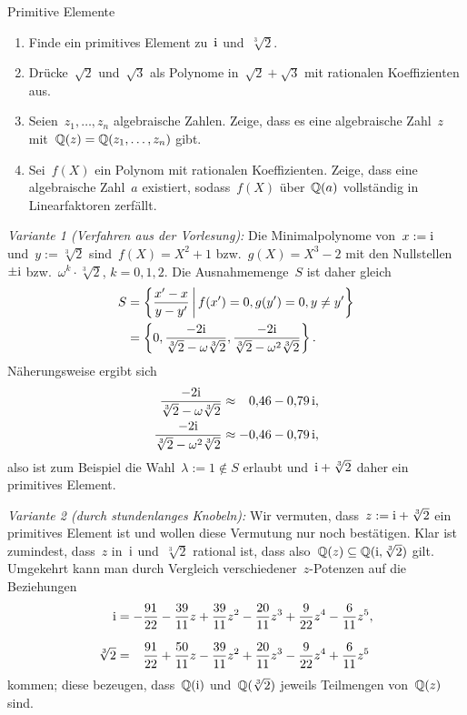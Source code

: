 \documentclass{algblatt}
\begin{document}
\begin{aufgabe}{Primitive Elemente}
\begin{enumerate}
\item Finde ein primitives Element zu~$\mathrm{i}$ und~$\sqrt[3]{2}$.
\item Drücke~$\sqrt{2}$ und~$\sqrt{3}$ als Polynome in~$\sqrt{2} + \sqrt{3}$
mit rationalen Koeffizienten aus.
\item Seien~$z_1,\ldots,z_n$ algebraische Zahlen. Zeige, dass es eine
algebraische Zahl~$z$ mit~$\mathbb{Q}(z) = \mathbb{Q}(z_1,\ldots,z_n)$ gibt.
\item Sei~$f(X)$ ein Polynom mit rationalen Koeffizienten. Zeige, dass eine
algebraische Zahl~$a$ existiert, sodass~$f(X)$ über~$\mathbb{Q}(a)$ vollständig in
Linearfaktoren zerfällt.\ifloesungen\enlargethispage{2em}\fi
\end{enumerate}

\begin{loesungE}
\item
\emph{Variante 1 (Verfahren aus der Vorlesung):}
Die Minimalpolynome von~$x := \mathrm{i}$ und~$y := \sqrt[3]{2}$ sind~$f(X) = X^2 + 1$
bzw.~$g(X) = X^3 - 2$ mit den Nullstellen~$\pm \mathrm{i}$ bzw.~$\omega^k \cdot \sqrt[3]{2}$,
$k=0,1,2$. Die Ausnahmemenge~$S$ ist daher gleich
\begin{align*}
  S &= \left\{ \frac{x' - x}{y - y'} \,\middle|\, f(x') = 0, g(y') = 0, y \neq
  y' \right\} \\
  &= \left\{ 0, \frac{-2\mathrm{i}}{\sqrt[3]{2} - \omega \sqrt[3]{2}},
    \frac{-2\mathrm{i}}{\sqrt[3]{2} - \omega^2 \sqrt[3]{2}} \right\}.
\end{align*}
Näherungsweise ergibt sich
\vspace{-1em}
\begin{align*}
  \frac{-2\mathrm{i}}{\sqrt[3]{2} - \omega \sqrt[3]{2}} \approx \phantom{+}0{,}46 - 0{,}79 \,\mathrm{i}, \\
  \frac{-2\mathrm{i}}{\sqrt[3]{2} - \omega^2 \sqrt[3]{2}} \approx -0{,}46 - 0{,}79 \,\mathrm{i},
\end{align*}
also ist zum Beispiel die Wahl~$\lambda := 1 \not\in S$ erlaubt und~$\mathrm{i} +
\sqrt[3]{2}$ daher ein primitives Element.

\emph{Variante 2 (durch stundenlanges Knobeln):}
Wir vermuten, dass~$z := \mathrm{i} + \sqrt[3]{2}$ ein primitives Element ist und
wollen diese Vermutung nur noch bestätigen. Klar ist zumindest, dass~$z$
in~$\mathrm{i}$ und~$\sqrt[3]{2}$ rational ist, dass also~$\mathbb{Q}(z) \subseteq
\mathbb{Q}(\mathrm{i},\sqrt[3]{2})$ gilt. Umgekehrt kann man durch Vergleich
verschiedener~$z$-Potenzen auf die Beziehungen
\begin{align*}
  \mathrm{i} &= -\frac{91}{22} - \frac{39}{11}z + \frac{39}{11}z^2 - \frac{20}{11}z^3 +
  \frac{9}{22}z^4 - \frac{6}{11}z^5, \\[0.7em]
  \sqrt[3]{2} &= \phantom{+}\frac{91}{22} + \frac{50}{11}z - \frac{39}{11}z^2 +
  \frac{20}{11}z^3 - \frac{9}{22}z^4 + \frac{6}{11}z^5
\end{align*}
kommen; diese bezeugen, dass~$\mathbb{Q}(\mathrm{i})$ und~$\mathbb{Q}(\sqrt[3]{2})$ jeweils
Teilmengen von~$\mathbb{Q}(z)$ sind.


\end{loesungE}
\end{aufgabe}
\end{document}
